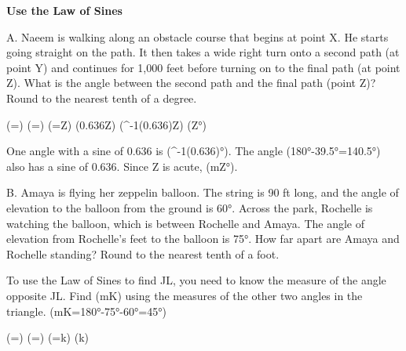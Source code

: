 \documentclass{article}
\newenvironment{example}[1]{}{}         %
\newcommand{\answer}[1]{}               %
\newcommand{\placeholder}[2]{}          %
\newcommand{\te}[1]{}                   %
\begin{document}
\begin{example}{2}
\textbf{Use the Law of Sines}
\te{APPLICATION}
A. Naeem is walking along an obstacle course that begins at point X. He starts going straight on the path. It then takes a wide right turn onto a second path (at point Y) and continues for 1,000 feet before turning on to the final path (at point Z). What is the angle between the second path and the final path (point Z)? Round to the nearest tenth of a degree.
\placeholder{illustration}{Overhead obstacle course among trees, triangular paths X lower left, Y upper left, Z upper right. XY 1,200 ft, YZ 1,000 ft; X angle 32°, Z marked ?. Black arrows along XY then YZ then ZX; rope bridges and person on ZX. Not drawn to scale.}
(=)
(=)
(=\sin Z)
(0.636\approx\sin Z)
(\sin^{-1}(0.636)\approx\angle Z)
(\angle Z°)
\te{Callout: Substitute the values into the equation and begin to solve for Z. USE STRUCTURE In order to apply the Law of Sines, you must know the measure of one angle and the length of the side opposite the angle.}
One angle with a sine of 0.636 is (\sin^{-1}(0.636)°). The angle (180°-39.5°=140.5°) also has a sine of 0.636. Since Z is acute, (m\angle Z°).
\answer{The angle between the second path and the final path is about 39.5°.}
B. Amaya is flying her zeppelin balloon. The string is 90 ft long, and the angle of elevation to the balloon from the ground is 60°. Across the park, Rochelle is watching the balloon, which is between Rochelle and Amaya. The angle of elevation from Rochelle's feet to the balloon is 75°. How far apart are Amaya and Rochelle standing? Round to the nearest tenth of a foot.
\placeholder{illustration}{Park with pond, trees and balloon above. Black triangle JKL connects Rochelle J lower left, balloon K above, Amaya L lower right; JL horizontal, KL 90 ft. Angle J 75°, L 60°.}
To use the Law of Sines to find JL, you need to know the measure of the angle opposite JL.
Find (m\angle K) using the measures of the other two angles in the triangle.
(m\angle K=180°-75°-60°=45°)
\te{REASON Could you have used (\angle L) to solve the problem instead? CONTINUED ON THE NEXT PAGE.}
(=)
(=)
(=k)
(k)
\te{Callout: Solve for k by cross-multiplication and then divide by sin 75°.}
\answer{Amaya and Rochelle are standing about 65.9 ft apart.}
\end{example}
\end{document}
